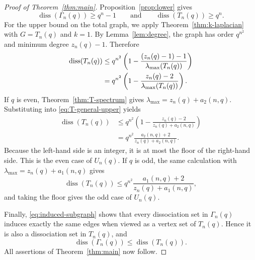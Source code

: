 \documentclass[11pt]{article}
\theoremstyle{definition}
\DeclareMathOperator{\diss}{diss}
\begin{document}
\begin{proof}[Proof of Theorem~\ref{thm:main}]
Proposition~\ref{prop:lower} gives
\[
  \diss(\Gamma_n(q))\ge q^n-1
  \qquad\text{and}\qquad
  \diss(T_n(q))\ge q^n.
\]
For the upper bound on the total graph, we apply Theorem~\ref{thm:k-laplacian} with $G=T_n(q)$ and $k=1$.  By Lemma~\ref{lem:degree}, the graph has order $q^{n^2}$ and minimum degree $z_n(q)-1$.  Therefore
\begin{align}
 \diss(T_n(q))
 &\le q^{n^2}\left(
 1-\frac{(z_n(q)-1)-1}{\lambda_{\max}(T_n(q))}
 \right)\notag\\
 &=q^{n^2}\left(
 1-\frac{z_n(q)-2}{\lambda_{\max}(T_n(q))}
 \right).                                                   \label{eq:T-general-upper}
\end{align}
If $q$ is even, Theorem~\ref{thm:T-spectrum} gives $\lambda_{\max}=z_n(q)+a_2(n,q)$.  Substituting into \eqref{eq:T-general-upper} yields
\begin{align*}
 \diss(T_n(q))
 &\le q^{n^2}\left(
 1-\frac{z_n(q)-2}{z_n(q)+a_2(n,q)}
 \right)\\
 &=q^{n^2}
 \frac{a_2(n,q)+2}{z_n(q)+a_2(n,q)}.
\end{align*}
Because the left-hand side is an integer, it is at most the floor of the right-hand side.  This is the even case of $U_n(q)$. If $q$ is odd, the same calculation with
$\lambda_{\max}=z_n(q)+a_1(n,q)$ gives
\[
 \diss(T_n(q))
 \le q^{n^2}
 \frac{a_1(n,q)+2}{z_n(q)+a_1(n,q)},
\]
and taking the floor gives the odd case of $U_n(q)$.

Finally, \eqref{eq:induced-subgraph} shows that every dissociation set in $\Gamma_n(q)$ induces exactly the same edges when viewed as a vertex set of $T_n(q)$.  Hence it is also a dissociation set in $T_n(q)$, and
\[
  \diss(\Gamma_n(q))\le\diss(T_n(q)).
\]
All assertions of Theorem~\ref{thm:main} now follow.
\end{proof}
\end{document}

